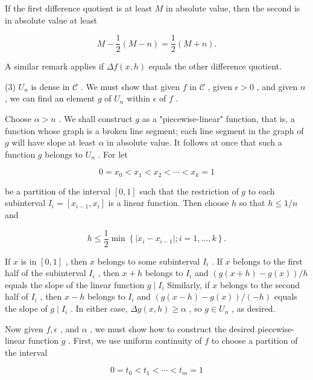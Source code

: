 \documentclass[10pt]{article}
\begin{document}
If the first difference quotient is at least \(M\) in absolute value, then the second is in absolute value at least

\[
M - \frac{1}{2}\left( {M - n}\right)  = \frac{1}{2}\left( {M + n}\right) .
\]

A similar remark applies if \({\Delta f}\left( {x,h}\right)\) equals the other difference quotient.

(3) \({U}_{n}\) is dense in \(\mathcal{C}\) . We must show that given \(f\) in \(\mathcal{C}\) , given \(\epsilon  > 0\) , and given \(n\) , we can find an element \(g\) of \({U}_{n}\) within \(\epsilon\) of \(f\) .

Choose \(\alpha  > n\) . We shall construct \(g\) as a "piecewise-linear" function, that is, a function whose graph is a broken line segment; each line segment in the graph of \(g\) will have slope at least \(\alpha\) in absolute value. It follows at once that such a function \(g\) belongs to \({U}_{n}\) . For let

\[
0 = {x}_{0} < {x}_{1} < {x}_{2} < \cdots  < {x}_{k} = 1
\]

be a partition of the interval \(\left\lbrack  {0,1}\right\rbrack\) such that the restriction of \(g\) to each subinterval \({I}_{i} = \left\lbrack  {{x}_{i - 1},{x}_{i}}\right\rbrack\) is a linear function. Then choose \(h\) so that \(h \leq  1/n\) and

\[
h \leq  \frac{1}{2}\min \left\{  {\left| {{x}_{i} - {x}_{i - 1}}\right| ;i = 1,\ldots ,k}\right\}  .
\]

If \(x\) is in \(\left\lbrack  {0,1}\right\rbrack\) , then \(x\) belongs to some subinterval \({I}_{i}\) . If \(x\) belongs to the first half of the subinterval \({I}_{i}\) , then \(x + h\) belongs to \({I}_{i}\) and \(\left( {g\left( {x + h}\right)  - g\left( x\right) }\right) /h\) equals the slope of the linear function \(g \mid  {I}_{i}\) Similarly, if \(x\) belongs to the second half of \({I}_{i}\) , then \(x - h\) belongs to \({I}_{i}\) and \(\left( {g\left( {x - h}\right)  - g\left( x\right) }\right) /\left( {-h}\right)\) equals the slope of \(g \mid  {I}_{i}\) . In either case, \({\Delta g}\left( {x,h}\right)  \geq  \alpha\) , so \(g \in  {U}_{n}\) , as desired.

Now given \(f,\epsilon\) , and \(\alpha\) , we must show how to construct the desired piecewise-linear function \(g\) . First, we use uniform continuity of \(f\) to choose a partition of the interval

\[
0 = {t}_{0} < {t}_{1} < \cdots  < {t}_{m} = 1
\]
\end{document}
